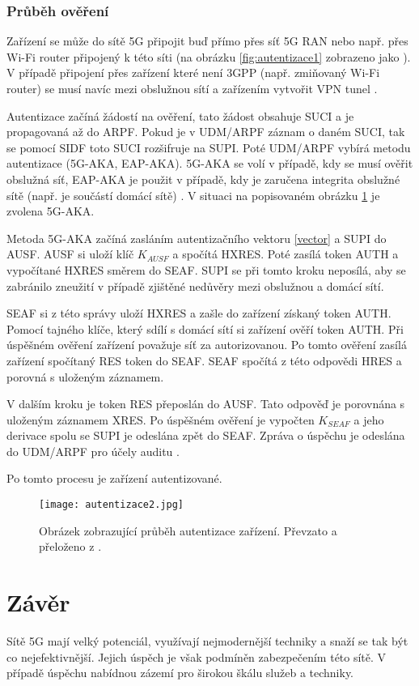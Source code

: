 \subsection{Průběh ověření}
Zařízení se může do sítě 5G připojit buď přímo přes síť 5G RAN nebo např. přes Wi-Fi router připojený k této síti (na obrázku \ref{fig:autentizace1} zobrazeno jako ). V případě připojení  přes zařízení které není 3GPP (např. zmiňovaný Wi-Fi router) se musí navíc mezi obslužnou sítí a zařízením  vytvořit VPN tunel \cite{autentizace3}.
\par
Autentizace začíná žádostí na ověření, tato žádost obsahuje SUCI a je propagovaná až do ARPF. Pokud je v UDM/ARPF záznam o daném SUCI, tak se pomocí SIDF toto SUCI rozšifruje na SUPI. Poté UDM/ARPF vybírá metodu autentizace (5G-AKA, EAP-AKA). 5G-AKA se volí v případě, kdy se musí ověřit obslužná síť, EAP-AKA je použit v případě, kdy je zaručena integrita obslužné sítě (např. je součástí domácí sítě) \cite{Schwarz}. V situaci na popisovaném obrázku \ref{fig:autentizace2} je zvolena 5G-AKA. 
\par
Metoda 5G-AKA začíná zasláním autentizačního vektoru \ref{vector} a SUPI do AUSF. AUSF si uloží klíč $K_{AUSF}$ a spočítá HXRES. Poté zasílá token AUTH a vypočítané HXRES směrem do SEAF. SUPI se při tomto kroku neposílá, aby se zabránilo zneužití v případě zjištěné nedůvěry mezi obslužnou a domácí sítí. 
\par
SEAF si z této správy uloží HXRES a zašle do zařízení získaný token AUTH. Pomocí tajného klíče, který sdílí s domácí sítí si zařízení ověří token AUTH. Při úspěšném ověření zařízení považuje síť za autorizovanou. Po tomto ověření zasílá zařízení spočítaný RES token do SEAF. SEAF spočítá z této odpovědi HRES a porovná s uloženým záznamem. 
\par
V dalším kroku je token RES přeposlán do AUSF. Tato odpověď je porovnána s uloženým záznamem XRES. Po úspěšném ověření je vypočten  $K_{SEAF}$ a jeho derivace spolu se SUPI je odeslána zpět do SEAF. Zpráva o úspěchu je odeslána do UDM/ARPF pro účely auditu \cite{autentizace3}. 
\par
Po tomto procesu je zařízení autentizované. 
\begin{figure}[!ht]
    \centering
    \texttt{[image: autentizace2.jpg]}
    \caption{Obrázek zobrazující průběh autentizace zařízení. Převzato a přeloženo z \cite{autentizace3}.}
    \label{fig:autentizace2}
    \end{figure}
\chapter{Závěr}\label{zaver}
Sítě 5G mají velký potenciál, využívají nejmodernější techniky a  snaží se tak být co nejefektivnější.  Jejich úspěch je však  podmíněn zabezpečením této sítě. V případě úspěchu nabídnou zázemí pro širokou škálu služeb a techniky.

